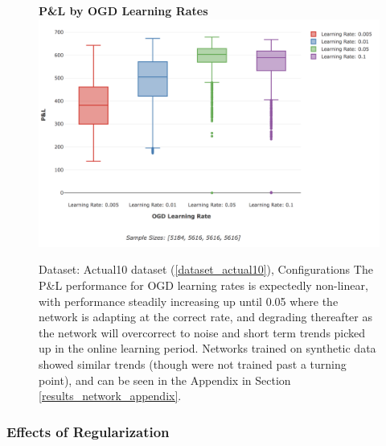 \documentclass[a4paper,11pt,oneside]{article}
\theoremstyle{plain}
\theoremstyle{definition}
\begin{document}
\begin{figure}[H]
	\textbf{P\&L by OGD Learning Rates}
	\centering
	\includegraphics[scale=0.35]{images/results/network/lr/actual_ogd_lr.png}
	\caption{Dataset: Actual10 dataset (\ref{dataset_actual10}), Configurations
		\newline The P\&L performance for OGD learning rates is expectedly non-linear, with performance steadily increasing up until 0.05 where the network is adapting at the correct rate, and degrading thereafter as the network will overcorrect to noise and short term trends picked up in the online learning period. Networks trained on synthetic data showed similar trends (though were not trained past a turning point), and can be seen in the Appendix in Section \ref{results_network_appendix}.}
	\label{figure-actual_ogd_lr}
\end{figure}






\subsubsection{Effects of Regularization}
\end{document}
